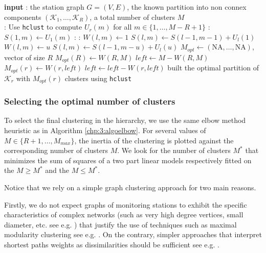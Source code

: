 \begin{enumerate}
\begin{algorithm}[htbp]
\begin{algorithmic}
\State \textbf{input} : the station graph $G=(V,E)$, the known partition into non connex components $(\mathcal{K}_1,\dots,\mathcal{K}_R)$, a total number of clusters $M$ \\
    
  : 
 \State Use \texttt{hclust} to compute $U_r(m)$ for all $m \in \{1,\dots,M-R+1\}$
 \EndFor 
  : 
 \State $S(1,m) \gets U_1(m)$ 
 \EndFor 
  : 
   : 
     \State $W(l,m) \gets 1$ 
     \State $S(l,m) \gets S(l-1,m-1)+U_l(1)$
     \State $W(l,m) \gets u$
     \State $S(l,m) \gets S(l-1,m-u)+U_l(u)$
   \EndIf
   \EndFor
 \EndFor 
 \EndFor 
 \State $M_{opt} \gets (\text{NA},\dots,\text{NA})$, vector of size $R$
 \State $M_{opt}(R) \gets W(R,M)$
 \State $\textit{left} \gets M-W(R,M)$
 \State $M_{opt}(r) \gets W(r,\textit{left})$
 \State $\textit{left} \gets \textit{left}-W(r,\textit{left})$
 \EndFor
 \State built the optimal partition of $\mathcal{K}_r$ with $M_{opt}(r)$ clusters using \texttt{hclust}
 \EndFor 
\end{algorithmic}
\end{algorithm} 
\end{enumerate}

\subsubsection{Selecting the optimal number of clusters}

To select the final clustering in the hierarchy, we use the same elbow method heuristic as in Algorithm \ref{chp:3:algoelbow}. For several values of $M\in\{R+1,\dots,M_{max}\}$, the inertia of the clustering is plotted against the corresponding number of clusters $M$. We look for the number of clusters $M^*$ that minimizes the sum of squares of a two part linear models respectively fitted on the $M \geq M^*$ and the $M \leq M^*$. 
\newline

Notice that we rely on a simple graph clustering approach for two main reasons. 

Firstly, we do not expect graphs of monitoring stations to exhibit the specific characteristics of complex networks (such as very high degree vertices, small diameter, etc. see e.g. \cite{Newman2003GraphSurveySIAM}) that justify the use of techniques such as maximal modularity clustering see e.g. \cite{FortunatoSurveyGraphs2010}. On the contrary, simpler approaches that interpret shortest paths weights as dissimilarities should be sufficient see e.g. \cite{Schaeffer:COSREV2007}. 

